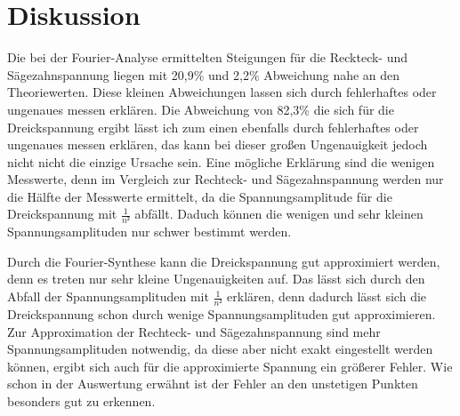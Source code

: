 \section{Diskussion}
Die bei der Fourier-Analyse ermittelten Steigungen für die Reckteck- und
Sägezahnspannung liegen mit 20,9\% und 2,2\% Abweichung nahe an den Theoriewerten.
Diese kleinen Abweichungen lassen sich durch fehlerhaftes oder ungenaues messen
erklären.
Die Abweichung von 82,3\% die sich für die Dreickspannung ergibt lässt ich zum einen
ebenfalls durch fehlerhaftes oder ungenaues messen erklären, das kann bei dieser
großen Ungenauigkeit jedoch nicht nicht die einzige Ursache sein.
Eine mögliche Erklärung sind die wenigen Messwerte, denn im Vergleich zur Rechteck- und
Sägezahnspannung werden nur die Hälfte der Messwerte ermittelt, da die
Spannungsamplitude für die Dreickspannung mit $\frac{1}{n²}$ abfällt. Daduch
können die wenigen und sehr kleinen Spannungsamplituden nur schwer bestimmt werden.

Durch die Fourier-Synthese kann die Dreickspannung gut approximiert werden, denn
es treten nur sehr kleine Ungenauigkeiten auf. Das lässt sich durch den Abfall
der Spannungsamplituden mit $\frac{1}{n²}$ erklären, denn dadurch lässt sich die
Dreickspannung schon durch wenige Spannungsamplituden gut approximieren.
Zur Approximation der Rechteck- und Sägezahnspannung sind mehr
Spannungsamplituden notwendig, da diese aber nicht exakt eingestellt werden können,
ergibt sich auch für die approximierte Spannung ein größerer Fehler.
Wie schon in der Auswertung erwähnt ist der Fehler an den unstetigen Punkten
besonders gut zu erkennen.

\label{sec:Diskussion}
